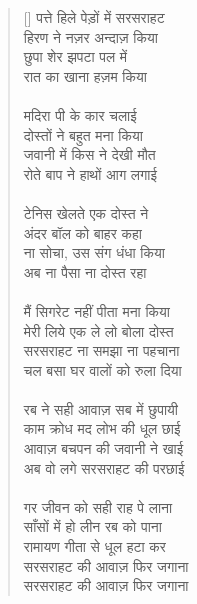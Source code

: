 \begin{verse}[\versewidth]\texthindi{
पत्ते हिले पेड़ों में सरसराहट\\
हिरण ने नज़र अन्दाज़ किया\\
छुपा शेर झपटा पल में\\
रात का खाना हज़म किया\\
\\
मदिरा पी के कार चलाई\\
दोस्तों ने बहुत मना किया\\
जवानी में किस ने देखी मौत\\
रोते बाप ने हाथों आग लगाई\\
\\
टेनिस खेलते एक दोस्त ने\\
अंदर बॉल को बाहर कहा\\
ना सोचा, उस संग धंधा किया\\
अब ना पैसा ना दोस्त रहा\\
\\
मैं सिगरेट नहीं पीता मना किया\\
मेरी लिये एक ले लो बोला दोस्त\\
सरसराहट ना समझा ना पहचाना\\
चल बसा घर वालों को रुला दिया\\
\\
रब ने सही आवाज़ सब में छुपायी\\
काम क्रोध मद लोभ की धूल छाई\\
आवाज़ बचपन की जवानी ने खाई\\
अब वो लगे सरसराहट की परछाई\\
\\
गर जीवन को सही राह पे लाना\\
साँसों में हो लीन रब को पाना\\
रामायण गीता से धूल हटा कर\\
सरसराहट की आवाज़ फिर जगाना\\
सरसराहट की आवाज़ फिर जगाना
}
\end{verse}

